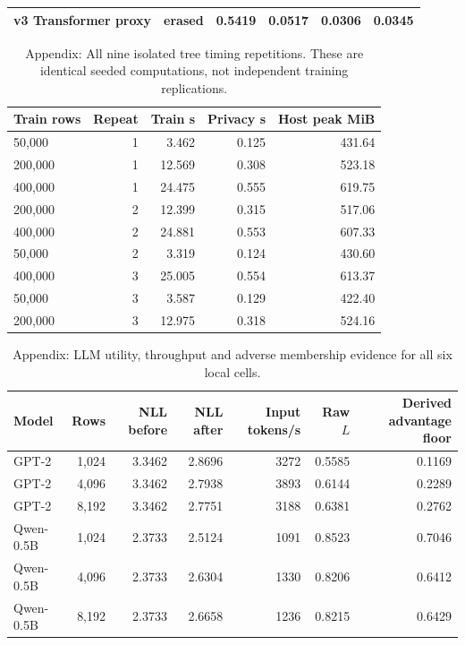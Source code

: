 {\begin{table}[t]
\begin{tabular}{lrrrrr}
v3 Transformer proxy & erased & 0.5419 & 0.0517 & 0.0306 & 0.0345 \\
\bottomrule
\end{tabular}
\end{table}
\begin{table}[t]
\centering\small
\caption{Appendix: All nine isolated tree timing repetitions. These are identical seeded computations, not independent training replications.}
\label{tab:tree-repeats}
\begin{tabular}{lrrrr}
\toprule
Train rows & Repeat & Train s & Privacy s & Host peak MiB \\
\midrule
50,000 & 1 & 3.462 & 0.125 & 431.64 \\
200,000 & 1 & 12.569 & 0.308 & 523.18 \\
400,000 & 1 & 24.475 & 0.555 & 619.75 \\
200,000 & 2 & 12.399 & 0.315 & 517.06 \\
400,000 & 2 & 24.881 & 0.553 & 607.33 \\
50,000 & 2 & 3.319 & 0.124 & 430.60 \\
400,000 & 3 & 25.005 & 0.554 & 613.37 \\
50,000 & 3 & 3.587 & 0.129 & 422.40 \\
200,000 & 3 & 12.975 & 0.318 & 524.16 \\
\bottomrule
\end{tabular}
\end{table}
\begin{table}[t]
\centering\small
\caption{Appendix: LLM utility, throughput and adverse membership evidence for all six local cells.}
\label{tab:llm-utility}
\begin{tabular}{lrrrrrr}
\toprule
Model & Rows & NLL before & NLL after & Input tokens/s & Raw $L$ & Derived advantage floor \\
\midrule
GPT-2 & 1,024 & 3.3462 & 2.8696 & 3272 & 0.5585 & 0.1169 \\
GPT-2 & 4,096 & 3.3462 & 2.7938 & 3893 & 0.6144 & 0.2289 \\
GPT-2 & 8,192 & 3.3462 & 2.7751 & 3188 & 0.6381 & 0.2762 \\
Qwen-0.5B & 1,024 & 2.3733 & 2.5124 & 1091 & 0.8523 & 0.7046 \\
Qwen-0.5B & 4,096 & 2.3733 & 2.6304 & 1330 & 0.8206 & 0.6412 \\
Qwen-0.5B & 8,192 & 2.3733 & 2.6658 & 1236 & 0.8215 & 0.6429 \\
\bottomrule
\end{tabular}
\end{table}
}
